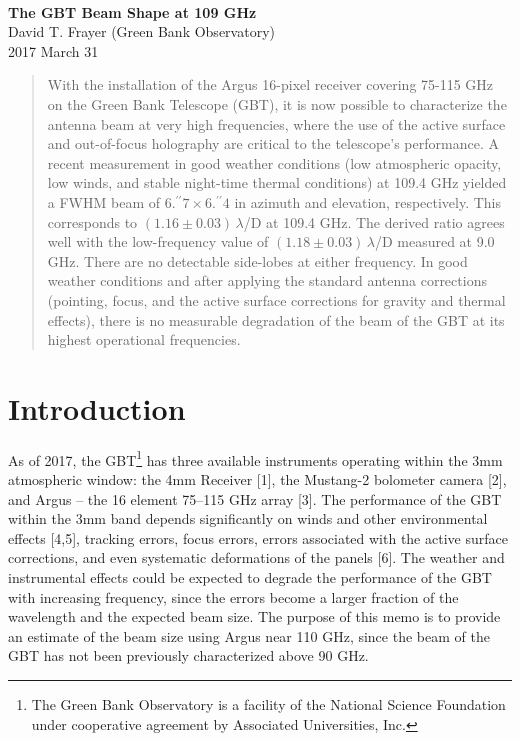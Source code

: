 \documentclass[12pt]{article}
\newcommand\farcs{\mbox{$.\!\!^{\prime\prime}$}}
\begin{document}
\begin{center}
\ \\
{\Large {\bf The GBT Beam Shape at 109 GHz}}
\ \\
David T. Frayer (Green Bank Observatory)\\
2017 March 31
\end{center}

\begin{abstract}

With the installation of the Argus 16-pixel receiver covering 75-115
GHz on the Green Bank Telescope (GBT), it is now possible to
characterize the antenna beam at very high frequencies, where the use
of the active surface and out-of-focus holography are critical to the
telescope's performance.  A recent measurement in good weather
conditions (low atmospheric opacity, low winds, and stable night-time
thermal conditions) at 109.4 GHz yielded a FWHM beam of $6\farcs7
\times 6\farcs4$ in azimuth and elevation, respectively.  This
corresponds to $(1.16 \pm 0.03)\,\lambda$/D at 109.4 GHz.  The derived
ratio agrees well with the low-frequency value of
$(1.18\pm0.03)\,\lambda$/D measured at 9.0 GHz.  There are no
detectable side-lobes at either frequency.  In good weather conditions
and after applying the standard antenna corrections (pointing, focus,
and the active surface corrections for gravity and thermal effects),
there is no measurable degradation of the beam of the GBT at its
highest operational frequencies.

\end{abstract}

\section{Introduction}

As of 2017, the GBT\footnote{The Green Bank Observatory is a facility
  of the National Science Foundation under cooperative agreement by
  Associated Universities, Inc.} has three available instruments
operating within the 3mm atmospheric window: the 4mm Receiver [1], the
Mustang-2 bolometer camera [2], and Argus -- the 16 element 75--115
GHz array [3].  The performance of the GBT within the 3mm band depends
significantly on winds and other environmental effects [4,5], tracking
errors, focus errors, errors associated with the active surface
corrections, and even systematic deformations of the panels [6].  The
weather and instrumental effects could be expected to degrade the
performance of the GBT with increasing frequency, since the errors
become a larger fraction of the wavelength and the expected beam size.
The purpose of this memo is to provide an estimate of the beam size
using Argus near 110 GHz, since the beam of the GBT has not been
previously characterized above 90 GHz.
\end{document}
